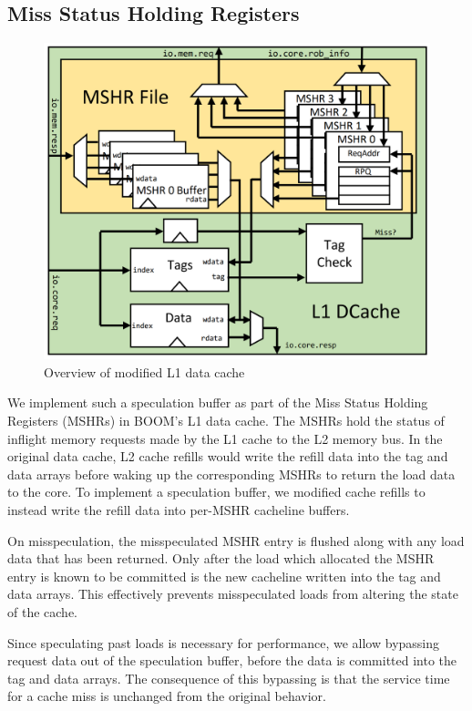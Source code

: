 \subsection{Miss Status Holding Registers}
\begin{figure}
  \begin{center}\includegraphics[scale=0.17]{dcache.png}\end{center}
  \caption{Overview of modified L1 data cache}
\end{figure}

We implement such a speculation buffer as part of the Miss Status Holding Registers (MSHRs) in BOOM's L1 data cache. The MSHRs hold the status of inflight memory requests made by the L1 cache to the L2 memory bus.
In the original data cache, L2 cache refills would write the refill data into the tag and data arrays before waking up the corresponding MSHRs to return the load data to the core.
To implement a speculation buffer, we modified cache refills to instead write the refill data into per-MSHR cacheline buffers.

On misspeculation, the misspeculated MSHR entry is flushed along with any load data that has been returned. Only after the load which allocated the MSHR entry is known to be committed is the new cacheline written into the tag and data arrays. This effectively prevents misspeculated loads from altering the state of the cache.

Since speculating past loads is necessary for performance, we allow bypassing request data out of the speculation buffer, before the data is committed into the tag and data arrays. The consequence of this bypassing is that the service time for a cache miss is unchanged from the original behavior.


